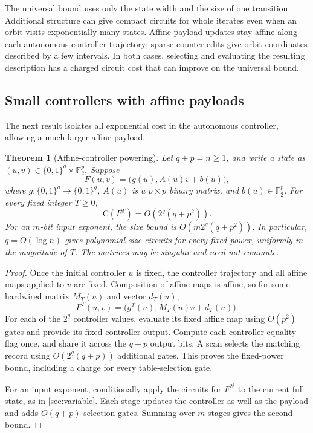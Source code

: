 \documentclass[11pt]{article}
\newtheorem{theorem}{Theorem}[section]
\theoremstyle{definition}
\theoremstyle{remark}
\newcommand{\bits}{\{0,1\}}
\newcommand{\CC}{\mathrm{C}}
\numberwithin{equation}{section}
\begin{document}
The universal bound uses only the state width and the size of one
transition.  Additional structure can give compact circuits for whole
iterates even when an orbit visits exponentially many states.  Affine
payload updates stay affine along each autonomous controller trajectory;
sparse counter edits give orbit coordinates described by a few intervals.
In both cases, selecting and evaluating the resulting description has a
charged circuit cost that can improve on the universal bound.

\subsection{Small controllers with affine payloads}\label{sec:controller}

The next result isolates all exponential cost in the autonomous controller,
allowing a much larger affine payload.

\begin{theorem}[Affine-controller powering]\label{thm:affine-controller}
Let $q+p=n\geq1$, and write a state as $(u,v)\in\bits^q\times\mathbb F_2^p$.
Suppose
\[
 F(u,v)=\bigl(g(u),A(u)v+b(u)\bigr),
\]
where $g:\bits^q\to\bits^q$, $A(u)$ is a $p\times p$ binary matrix,
and $b(u)\in\mathbb F_2^p$.  For every fixed integer $T\geq0$,
\[
 \CC(F^T)=O\!\left(2^q(q+p^2)\right).
\]
For an $m$-bit input exponent, the size bound is
$O(m2^q(q+p^2))$.  In particular, $q=O(\log n)$ gives polynomial-size
circuits for every fixed power, uniformly in the magnitude of $T$.
The matrices may be singular and need not commute.
\end{theorem}

\begin{proof}
Once the initial controller $u$ is fixed, the controller trajectory and
all affine maps applied to $v$ are fixed.  Composition of affine maps is
affine, so for some hardwired matrix $M_T(u)$ and vector $d_T(u)$,
\[
 F^T(u,v)=\bigl(g^T(u),M_T(u)v+d_T(u)\bigr).
\]
For each of the $2^q$ controller values, evaluate its fixed affine map
using $O(p^2)$ gates and provide its fixed controller output.  Compute
each controller-equality flag once, and share it across the $q+p$ output
bits.  A scan selects the matching record using
$O(2^q(q+p))$ additional gates.  This proves the fixed-power bound,
including a charge for every table-selection gate.

For an input exponent, conditionally apply the circuits for $F^{2^j}$
to the current full state, as in \cref{sec:variable}.  Each stage updates
the controller as well as the payload and adds $O(q+p)$ selection gates.
Summing over $m$ stages gives the second bound.
\end{proof}
\end{document}
